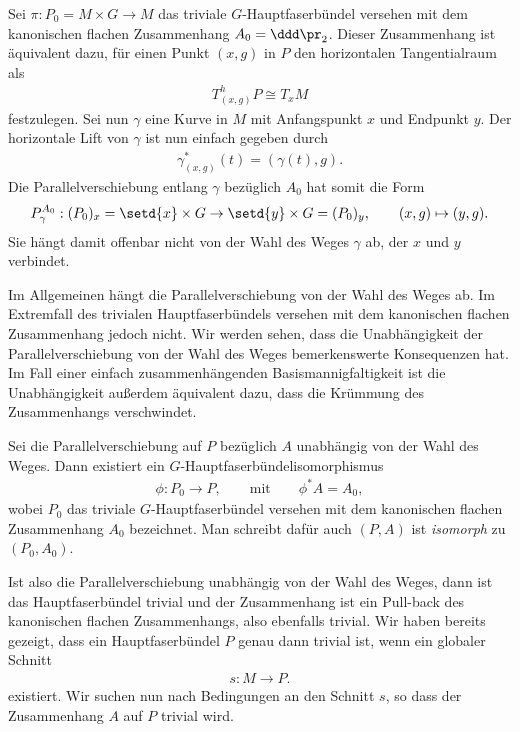 \documentclass[%
	paper=a5,%
	fleqn,%
	DIV=18,%
	BCOR=0mm,
	fontsize=11pt,
	titlepage=false,%
	bibliography=totoc,
	DIV=18,%
	twoside=true,
	pdftitle=Riemannsche Geometrie,
	pdfauthor=Uwe Semmelmann,
	numbers=noendperiod]%
	{scrbook}
\begin{document}
\begin{ex}
\begin{exenum}
\item
\label{ex:Parallelverschiebung-unabhängig-kanonisch-flach}
Sei $\pi: P_0 = M\times G\to M$ das triviale $G$-Hauptfaserbündel versehen mit
dem kanonischen flachen Zusammenhang $A_0=\ddd \pr_2$. Dieser Zusammenhang ist
äquivalent dazu, für einen Punkt $(x,g)$ in $P$ den horizontalen Tangentialraum
als
\begin{align*}
T_{(x,g)}^hP \cong T_xM
\end{align*}
festzulegen. Sei nun $\gamma$ eine Kurve in $M$ mit Anfangspunkt $x$ und
Endpunkt $y$. Der horizontale Lift von $\gamma$ ist nun einfach gegeben durch
\begin{align*}
\gamma_{(x,g)}^*(t) = (\gamma(t),g).
\end{align*}
Die Parallelverschiebung entlang $\gamma$ bezüglich $A_0$ hat somit die Form
\begin{align*}
P_\gamma^{A_0} : (P_0)_x = \setd{x}\times G\to \setd{y}\times G = (P_0)_y,\qquad
(x,g) \mapsto (y,g).
\end{align*}
Sie hängt damit offenbar nicht von der Wahl des Weges $\gamma$ ab, der $x$ und
$y$ verbindet.\boxc
\end{exenum}
\end{ex}

Im Allgemeinen hängt die Parallelverschiebung von der Wahl des Weges ab. Im
Extremfall des trivialen Hauptfaserbündels versehen mit dem kanonischen flachen
Zusammenhang jedoch nicht. Wir werden sehen, dass die Unabhängigkeit der
Parallelverschiebung von der Wahl des Weges bemerkenswerte Konsequenzen hat.
Im Fall einer einfach zusammenhängenden Basismannigfaltigkeit ist die
Unabhängigkeit außerdem äquivalent dazu, dass die Krümmung des Zusammenhangs
verschwindet.

\begin{prop}
Sei die Parallelverschiebung auf $P$ bezüglich $A$ unabhängig von der Wahl des
Weges. Dann existiert ein $G$-Hauptfaserbündelisomorphismus
\begin{align*}
\phi: P_0\to P,\qquad \text{mit}\qquad \phi^* A = A_0,
\end{align*}
wobei $P_0$ das triviale $G$-Hauptfaserbündel versehen mit dem kanonischen
flachen Zusammenhang $A_0$ bezeichnet. Man schreibt dafür auch $(P,A)$ ist
\emph{isomorph} zu $(P_0,A_0)$.\fish
\end{prop}

Ist also die Parallelverschiebung unabhängig von der Wahl des Weges, dann ist
das Hauptfaserbündel trivial und der Zusammenhang ist ein Pull-back des
kanonischen flachen Zusammenhangs, also ebenfalls trivial. Wir haben bereits
gezeigt, dass ein Hauptfaserbündel $P$ genau dann trivial ist, wenn ein
globaler Schnitt
\begin{align*}
s: M\to P.
\end{align*}
existiert. Wir suchen nun nach Bedingungen an den Schnitt $s$, so dass der
Zusammenhang $A$ auf $P$ trivial wird.
\end{document}

